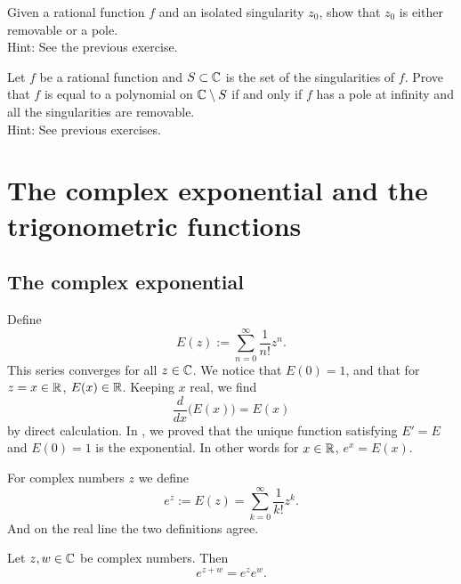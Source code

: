 \begin{exercise}
Given a rational function $f$ and an isolated singularity $z_0$,
show that $z_0$ is either removable or a pole.
\\
Hint: See the previous exercise.
\end{exercise}

\begin{exercise}
Let $f$ be a rational function and $S \subset {\mathbb{C}}$ is the 
set of the singularities of $f$.
Prove that $f$ is equal to a polynomial on ${\mathbb{C}} \setminus S$
if and only if
$f$ has a pole at infinity and all the singularities are removable.
\\
Hint: See previous exercises.
\end{exercise}



\sectionnewpage
\section{The complex exponential and the trigonometric functions}
\label{sec:complexexp}


\subsection{The complex exponential}

Define
\begin{equation*}
E(z) := \sum_{n=0}^\infty \frac{1}{n!} z^n .
\end{equation*}
This series converges for all $z \in {\mathbb{C}}$.   We notice that $E(0) = 1$,
and that for $z=x \in {\mathbb{R}}$, $E(x) \in {\mathbb{R}}$.  Keeping $x$ real, we find
\begin{equation*}
\frac{d}{dx} \bigl( E(x) \bigr) = E(x)
\end{equation*}
by direct calculation.
In , we proved that
the unique function satisfying $E' = E$ and
$E(0) = 1$ is the exponential.  In other words for $x \in {\mathbb{R}}$, $e^x = E(x)$.

For complex numbers $z$ we define
\begin{equation*}
e^z := E(z) = 
\sum_{k=0}^\infty \frac{1}{k!} z^k .
\end{equation*}
And on the real line the two definitions agree.

\begin{prop}
Let $z,w \in {\mathbb{C}}$ be complex numbers.  Then
\begin{equation*}
e^{z+w} = e^z e^w.
\end{equation*}
\end{prop}

